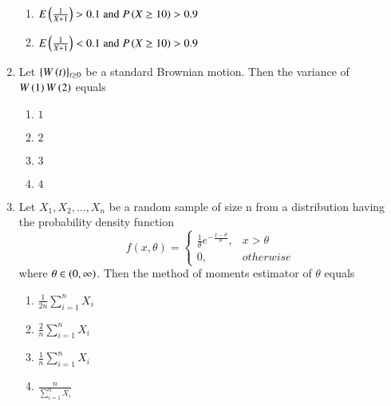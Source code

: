 \documentclass[journal,12pt,onecolumn]{IEEEtran}
\theoremstyle{remark}
\begin{document}
\begin{enumerate}
\begin{enumerate}
    \item $E\left(\frac{1}{X+1}\right)>0.1 \; \text{and} \; P\left(X\geq10\right)>0.9$
    \item $E\left(\frac{1}{X+1}\right)<0.1 \; \text{and} \; P\left(X\geq10\right)>0.9$
\end{enumerate}
\item Let $\{W\left(t\right)\}_{t\geq 0}$ be a standard Brownian motion. Then the variance of $W\left(1\right)W\left(2\right)$ equals
\begin{enumerate}
    \item $1$
    \item $2$
    \item $3$
    \item $4$
\end{enumerate}
\item Let $X_1,X_2,\ldots,X_n$ be a random sample of size n from a distribution having the probability density function
$$
f(x,\theta) = 
\begin{cases} 
    \frac{1}{\theta}e^{-\frac{x-\theta}{\theta}}, &  x > \theta \\ 
    0, &  otherwise 
\end{cases}
$$ where $\theta \in \left(0,\infty\right)$. Then the method of moments estimator of $\theta$ equals
\begin{enumerate}
    \item $\frac{1}{2n}\sum_{i=1}^nX_i$
    \item $\frac{2}{n}\sum_{i=1}^nX_i$
    \item $\frac{1}{n}\sum_{i=1}^nX_i$
    \item $\frac{n}{\sum_{i=1}^{n}X_i}$
\end{enumerate}


\end{enumerate}
\end{document}
